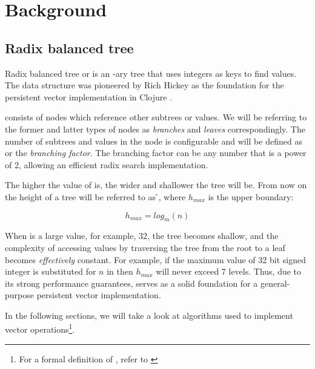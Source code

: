 
\chapter{Background}

\section{Radix balanced tree}
\label{chapter:radix-balanced-tree}

Radix balanced tree or \treerb{} is an \m{}-ary tree that uses integers as keys to find values. The data structure was pioneered by Rich Hickey as the foundation for the persistent vector implementation in Clojure \cite{the-clojure-programming-language}.

\treerb{} consists of nodes which reference other subtrees or values. We will be referring to the former and latter types of nodes as \emph{branches} and \emph{leaves} correspondingly. The number of subtrees and values in the node is configurable and will be defined as \m{} or the \emph{branching factor}. The branching factor can be any number that is a power of 2, allowing an efficient radix search implementation.

The higher the value of \m{} is, the wider and shallower the tree will be. From now on the height of a tree will be referred to as \h{}, where $h_{max}$ is the upper boundary:

\begin{equation}
    \label{eq:h-max}
    h_{max} = log_m(n)
\end{equation}

When \m{} is a large value, for example, 32, the tree becomes shallow, and the complexity of accessing values by traversing the tree from the root to a leaf becomes \emph{effectively} constant. For example, if the maximum value of 32 bit signed integer is substituted for $n$ in  then $h_{max}$ will never exceed 7 levels. Thus, due to its strong performance guarantees, \treerb{} serves as a solid foundation for a general-purpose persistent vector implementation.

In the following sections, we will take a look at \treerb{} algorithms used to implement vector operations\footnote{For a formal definition of \treerb{}, refer to \cite{improving-performance-through-transience}}.

